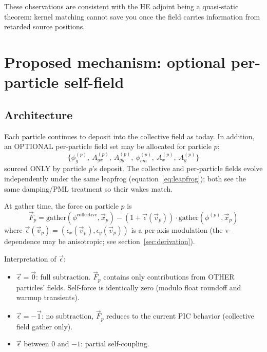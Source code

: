 \documentclass[11pt,a4paper]{article}
\begin{document}
These observations are consistent with the HE adjoint being a
quasi-static theorem: kernel matching cannot save you once the field
carries information from retarded source positions.

\section{Proposed mechanism: optional per-particle self-field}

\subsection{Architecture}

Each particle continues to deposit into the collective field as
today.  In addition, an OPTIONAL per-particle field set may be
allocated for particle $p$:
\begin{equation}
\{\phi_g^{(p)},\ A_{gx}^{(p)},\ A_{gy}^{(p)},\
   \phi_{em}^{(p)},\ A_x^{(p)},\ A_y^{(p)}\}
\end{equation}
sourced ONLY by particle $p$'s deposit.  The collective and
per-particle fields evolve independently under the same leapfrog
(equation~\ref{eq:leapfrog}); both see the same damping/PML
treatment so their wakes match.

At gather time, the force on particle $p$ is
\begin{equation}
\vec F_p = \mathrm{gather}\!\left(\phi^{\mathrm{collective}}, \vec x_p\right)
- (1 + \vec\epsilon(\vec v_p)) \cdot
  \mathrm{gather}\!\left(\phi^{(p)}, \vec x_p\right)
\label{eq:force}
\end{equation}
where $\vec\epsilon(\vec v_p) = (\epsilon_x(\vec v_p), \epsilon_y(\vec v_p))$
is a per-axis modulation (the v-dependence may be anisotropic; see
section~\ref{sec:derivation}).

Interpretation of $\vec\epsilon$:
\begin{itemize}
  \item $\vec\epsilon = \vec 0$: full subtraction.  $\vec F_p$ contains
    only contributions from OTHER particles' fields.  Self-force is
    identically zero (modulo float roundoff and warmup transients).
  \item $\vec\epsilon = -\vec 1$: no subtraction, $\vec F_p$ reduces
    to the current PIC behavior (collective field gather only).
  \item $\vec\epsilon$ between $0$ and $-1$: partial self-coupling.
\end{itemize}
\end{document}
